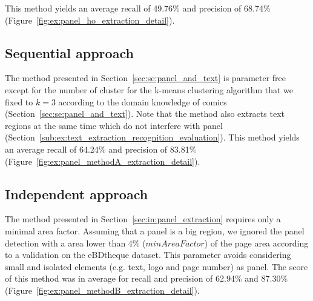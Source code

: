 This method yields an average recall of 49.76\% and precision of 68.74\% (Figure~\ref{fig:ex:panel_ho_extraction_detail}).


\subsection{Sequential approach} %
\label{sub:ex:panel_extraction_rigaud_method_A}

The method presented in Section~\ref{sec:se:panel_and_text} is parameter free except for the number of cluster for the k-means clustering algorithm that we fixed to $k=3$ according to the domain knowledge of comics (Section~\ref{sec:se:panel_and_text}).
Note that the method also extracts text regions at the same time which do not interfere with panel (Section~\ref{sub:ex:text_extraction_recognition_evaluation}).
This method yields an average recall of 64.24\% and precision of 83.81\% (Figure~\ref{fig:ex:panel_methodA_extraction_detail}).


\subsection{Independent approach} %
The method presented in Section~\ref{sec:in:panel_extraction} requires only a minimal area factor.
Assuming that a panel is a big region, we ignored the panel detection with a area lower than 4\% ($minAreaFactor$) of the page area according to a validation on the eBDtheque dataset.
This parameter avoids considering small and isolated elements (e.g. text, logo and page number) as panel.
The score of this method was in average for recall and precision of 62.94\% and 87.30\% (Figure~\ref{fig:ex:panel_methodB_extraction_detail}).

